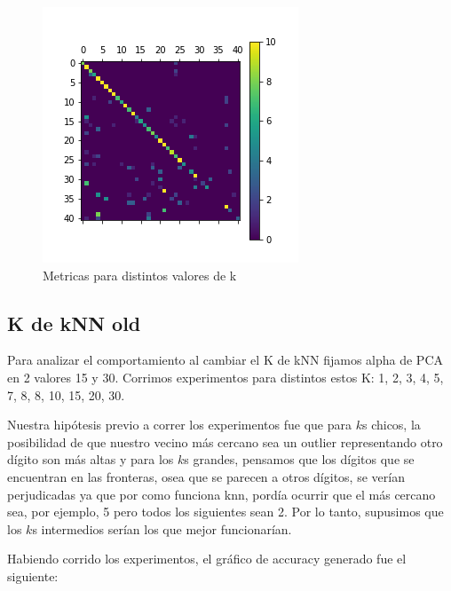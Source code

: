 \begin{figure}[H]
    \begin{center}
      \includegraphics[width=0.8\columnwidth]{imagenes/charuli-des/Confusion_matrix_for_k_25.png}
      \caption{Metricas para distintos valores de k}
    \end{center}
\end{figure}

\subsection{K de kNN old}

Para analizar el comportamiento al cambiar el K de kNN fijamos alpha de PCA en 2 valores 15 y 30. Corrimos experimentos para distintos estos K: 1, 2, 3, 4, 5, 7, 8, 8, 10, 15, 20, 30.

Nuestra hipótesis previo a correr los experimentos fue que para $k$s chicos, la posibilidad de que nuestro vecino más cercano sea un outlier representando otro dígito son más altas y para los $k$s grandes, pensamos que los dígitos que se encuentran en las fronteras, osea que se parecen a otros dígitos, se verían perjudicadas ya que por como funciona knn, pordía ocurrir que el más cercano sea, por ejemplo, 5 pero todos los siguientes sean 2. Por lo tanto, supusimos que los $k$s intermedios serían los que mejor funcionarían.

Habiendo corrido los experimentos, el gráfico de accuracy generado fue el siguiente:

